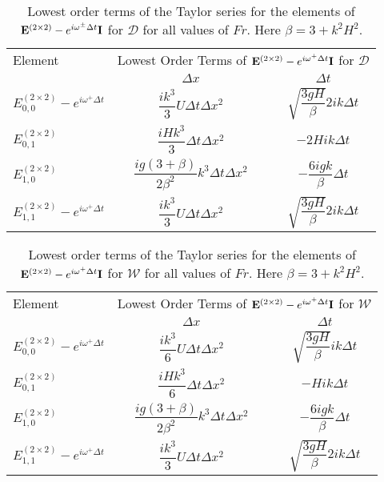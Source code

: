\begin{table}
	\centering
	\begin{tabular}{l  c c}
		\hline
		Element & \multicolumn{2}{c}{Lowest Order Terms of $\mathbf{E}^{\left(2\times 2\right)} - e^{i \omega^+ \Delta t} \mathbf{I}$ for $\mathcal{D}$} \T \B \\
		\cline{2-3}
		& $\Delta x$&$\Delta t$ \T \B \\
		\hline
		${E}^{\left(2\times 2\right)}_{0,0} -  e^{i \omega^+ \Delta t} $&$\dfrac{ik^3}{3} U \Delta t \Delta x^2$ & $ \sqrt{\dfrac{3gH}{\beta}} 2ik \Delta t $ \T \B  \\
		${E}^{\left(2\times 2\right)}_{0,1}$& $\dfrac{iHk^3}{3} \Delta t \Delta x^2$ & $-2Hi k \Delta t$ \T \B  \\
		${E}^{\left(2\times 2\right)}_{1,0}$& $ \dfrac{ig \left(3 + \beta\right)}{2\beta^2} k^3\Delta t \Delta x^2$ &$ -\dfrac{6igk}{\beta} \Delta t$ \T \B  \\
		${E}^{\left(2\times 2\right)}_{1,1} -  e^{i \omega^+ \Delta t}$& $\dfrac{ik^3}{3} U \Delta t \Delta x^2$ & $ \sqrt{\dfrac{3gH}{\beta}} 2ik \Delta t $ \T \B  \\  \hline
	\end{tabular}
	\caption{Lowest order terms of the Taylor series for the elements of $\mathbf{E}^{\left(2\times 2\right)} - e^{i \omega^\pm \Delta t} \mathbf{I}$ for $\mathcal{D}$ for all values of $Fr$. Here $\beta = 3 + k^2 H^2$.}
	\label{tab:EerrD} 
\end{table}
\begin{table}
	\centering
	\begin{tabular}{l  c c}
		\hline
		Element & \multicolumn{2}{c}{Lowest Order Terms of $\mathbf{E}^{\left(2\times 2\right)} - e^{i \omega^+ \Delta t} \mathbf{I}$ for $\mathcal{W}$} \T \B \\
		\cline{2-3} 
		& $\Delta x$&$\Delta t$ \T \B \\
		\hline 
		$E^{\left(2\times 2\right)}_{0,0} -  e^{i \omega^+ \Delta t} $&  $\dfrac{ik^3}{6} U \Delta t \Delta x^2$ & $ \sqrt{\dfrac{3gH}{\beta}} ik \Delta t $ \T \B \\
		$E^{\left(2\times 2\right)}_{0,1}$& $\dfrac{iHk^3}{6} \Delta t \Delta x^2$ &  $-Hi k \Delta t$ \T \B \\
		$E^{\left(2\times 2\right)}_{1,0}$& $ \dfrac{ig \left(3 + \beta\right)}{2\beta^2} k^3\Delta t \Delta x^2$ &  $ -\dfrac{6igk}{\beta} \Delta t$ \T \B  \\
		$E^{\left(2\times 2\right)}_{1,1} -  e^{i \omega^+ \Delta t}$& $\dfrac{ik^3}{3} U \Delta t \Delta x^2$ & $ \sqrt{\dfrac{3gH}{\beta}} 2ik \Delta t $ \T \B  \\  \hline
	\end{tabular}
	\caption{Lowest order terms of the Taylor series for the elements of $\mathbf{E}^{\left(2\times 2\right)} - e^{i \omega^+ \Delta t} \mathbf{I}$ for $\mathcal{W}$ for all values of $Fr$. Here $\beta = 3 + k^2 H^2$.}
	\label{tab:EerrW} 
\end{table}
